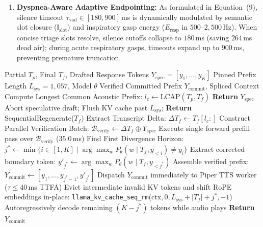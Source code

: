 \documentclass[10pt,journal,compsoc]{IEEEtran}
\begin{document}
\begin{enumerate}
    \item \textbf{Dyspnea-Aware Adaptive Endpointing:} As formulated in Equation~(9), silence timeout $\tau_{\text{vad}} \in [180, 900]$\,ms is dynamically modulated by semantic slot closure ($\mathbb{I}_{\text{slot}}$) and inspiratory gasp energy ($E_{\text{resp}}$ in $500\text{--}2{,}500$\,Hz). When concise triage slots resolve, silence cutoffs collapse to $180$\,ms (saving $264$\,ms dead air); during acute respiratory gasps, timeouts expand up to $900$\,ms, preventing premature truncation.
\end{enumerate}

\begin{algorithm}[!t]
\caption{Continuous Speculative Shift \& Verification (CSSV)}
\label{alg:cssv_engine}
\footnotesize
\begin{algorithmic}[1]
\REQUIRE Partial $T_p$, Final $T_f$, Drafted Response Tokens $Y_{\text{spec}} = [y_1, \dots, y_K]$
\REQUIRE Pinned Prefix Length $L_{\text{sys}} = 1{,}057$, Model $\theta$
\ENSURE Verified Committed Prefix $Y_{\text{commit}}$, Spliced Context
\STATE Compute Longest Common Acoustic Prefix: $l_c \leftarrow \text{LCAP}(T_p, T_f)$
    \STATE \textbf{Return} $Y_{\text{spec}}$ 
\ENDIF
{}
    \STATE Abort speculative draft; Flush KV cache past $L_{\text{sys}}$;
    \STATE \textbf{Return} SequentialRegenerate($T_f$) 
\ENDIF
\STATE Extract Transcript Delta: $\Delta T_f \leftarrow T_f[l_c:]$
\STATE Construct Parallel Verification Batch: $\mathcal{B}_{\text{verify}} \leftarrow \Delta T_f \oplus Y_{\text{spec}}$
\STATE Execute single forward prefill pass over $\mathcal{B}_{\text{verify}}$ ($35.0$\,ms)
\STATE Find First Divergence Horizon:
\STATE $j^* \leftarrow \min \{ i \in [1, K] \mid \arg\max_{w} P_\theta(w \mid T_f, y_{<i}) \neq y_i \}$
\STATE Extract corrected boundary token: $y'_{j^*} \leftarrow \arg\max_{w} P_\theta(w \mid T_f, y_{<j^*})$
\STATE Assemble verified prefix: $Y_{\text{commit}} \leftarrow [y_1, \dots, y_{j^*-1}, y'_{j^*}]$
\STATE Dispatch $Y_{\text{commit}}$ immediately to Piper TTS worker ($\tau \le 40$\,ms TTFA)
\STATE Evict intermediate invalid KV tokens and shift RoPE embeddings in-place:
\STATE \texttt{llama\_kv\_cache\_seq\_rm}($\text{ctx}, 0, L_{\text{sys}} + |T_f| + j^*, -1$)
\STATE Autoregressively decode remaining $(K - j^*)$ tokens while audio plays
\STATE \textbf{Return} $Y_{\text{commit}}$
\end{algorithmic}
\end{algorithm}
\end{document}
